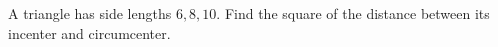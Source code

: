 A triangle has side lengths $6,8,10$. Find the square of the distance between its incenter and circumcenter.
